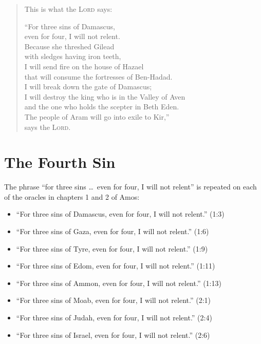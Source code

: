 \VerseQuoteStyle
\begin{quote}
    This is what the \textsc{Lord} says:

    \VerseIndent\enquote{For three sins of Damascus,\\
    \VerseIndentTwo even for four, I will not relent.\\
    \VerseIndent Because she threshed Gilead\\
    \VerseIndentTwo with sledges having iron teeth,\\
    \VerseIndent I will send fire on the house of Hazael\\
    \VerseIndentTwo that will consume the fortresses of Ben-Hadad.\\
    \VerseIndent I will break down the gate of Damascus;\\
    \VerseIndentTwo I will destroy the king who is in the Valley of Aven\\
    \VerseIndent and the one who holds the scepter in Beth Eden.\\
    \VerseIndentTwo The people of Aram will go into exile to Kir,}\\
    \VerseIndentFour says the \textsc{Lord}.\\
\end{quote}
\NormalQuoteStyle


\section{The Fourth Sin}

The phrase \enquote{for three sins \dots\ even for four, I will not relent} is
repeated on each of the oracles in chapters 1 and 2 of Amos:

\begin{itemize}
    \item\enquote{For three sins of Damascus, even for four, I will not relent.}
    (1:3)
    \item\enquote{For three sins of Gaza, even for four, I will not relent.}
    (1:6)
    \item\enquote{For three sins of Tyre, even for four, I will not relent.}
    (1:9)
    \item\enquote{For three sins of Edom, even for four, I will not relent.}
    (1:11)
    \item\enquote{For three sins of Ammon, even for four, I will not relent.}
    (1:13)
    \item\enquote{For three sins of Moab, even for four, I will not relent.}
    (2:1)
    \item\enquote{For three sins of Judah, even for four, I will not relent.}
    (2:4)
    \item\enquote{For three sins of Israel, even for four, I will not relent.}
    (2:6)
\end{itemize}

